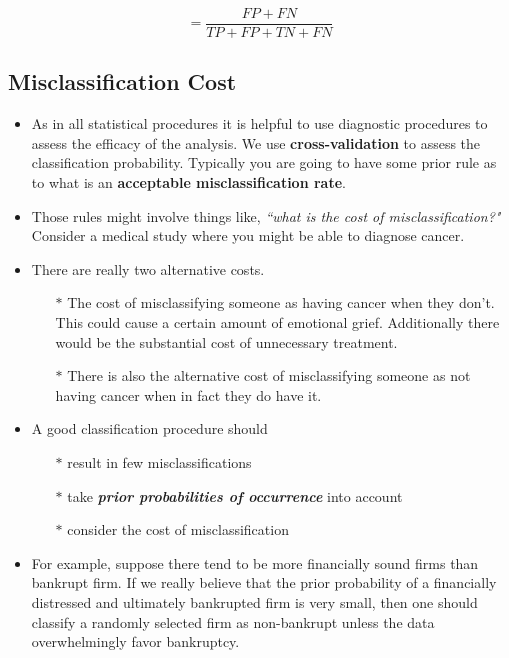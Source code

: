 \[ = \frac{FP + FN}{TP+FP+TN+FN}\]


\subsection{Misclassification Cost}
\begin{itemize}
	\item As in all statistical procedures it is helpful to use diagnostic procedures to assess the efficacy of the analysis. We use \textbf{cross-validation} to assess the classification probability.
	Typically you are going to have some prior rule as to what is an \textbf{acceptable misclassification rate}.
	
	\item	Those rules might involve things like, \textit{``what is the cost of misclassification?"} Consider a medical study where you might be able to diagnose cancer.
	
	\item There are really two alternative costs. 
	\begin{itemize}
		\item[$\ast$] The cost of misclassifying someone as having cancer when they don't.
	This could cause a certain amount of emotional grief. Additionally there would be the substantial cost of unnecessary treatment.
	
	\item[$\ast$] There is also the alternative cost of misclassifying someone as not having cancer when in fact they do have it.
	\end{itemize}
	\item A good classification procedure should
	\begin{itemize}
		\item[$\ast$] result in few misclassifications
		\item[$\ast$] take \textbf{\textit{prior probabilities of occurrence}} into account
		\item[$\ast$] consider the cost of misclassification
	\end{itemize}
	
	\item 	For example, suppose there tend to be more financially sound firms than bankrupt
	firm. If we really believe that the prior probability of a financially
	distressed and ultimately bankrupted firm is very small, then one should
	classify a randomly selected firm as non-bankrupt unless the data
	overwhelmingly favor bankruptcy.
	
	
	

\end{itemize}
